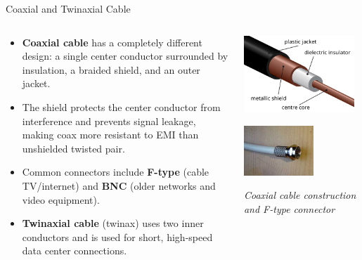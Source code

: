 \documentclass[aspectratio=169]{beamer}
\begin{document}
\begin{frame}{Coaxial and Twinaxial Cable}
    \begin{columns}[T]
        \begin{column}{0.55\textwidth}
            \begin{itemize}
                \item \textbf{Coaxial cable} has a completely different design: a single center conductor surrounded by insulation, a braided shield, and an outer jacket.
                \item The shield protects the center conductor from interference and prevents signal leakage, making coax more resistant to EMI than unshielded twisted pair.
                \item Common connectors include \textbf{F-type} (cable TV/internet) and \textbf{BNC} (older networks and video equipment).
                \item \textbf{Twinaxial cable} (twinax) uses two inner conductors and is used for short, high-speed data center connections.
            \end{itemize}
        \end{column}
        \begin{column}{0.4\textwidth}
            \centering
            \includegraphics[width=0.95\textwidth]{Coaxial_cable_cutaway.png}
            \vspace{0.3cm}
            
            \includegraphics[width=0.6\textwidth]{F_connector_male.jpg}
            
            \small{\textit{Coaxial cable construction and F-type connector}}
        \end{column}
    \end{columns}
\end{frame}
\end{document}
